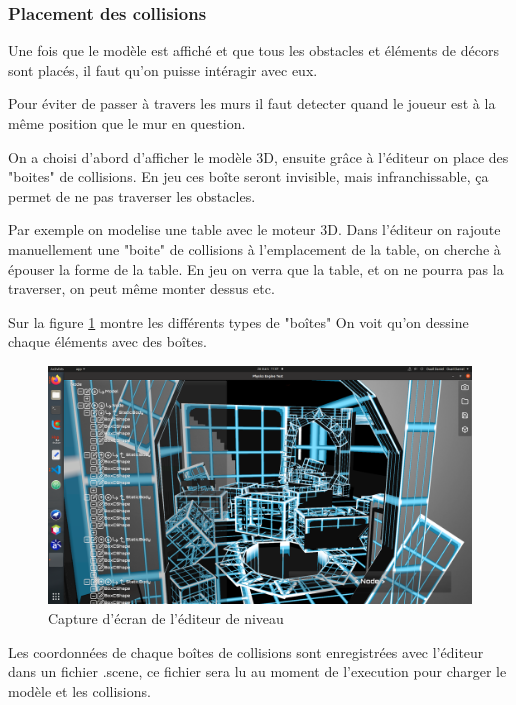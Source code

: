 \newpage
\subsubsection{Placement des collisions}
Une fois que le modèle est affiché et que tous les obstacles et éléments de
décors sont placés, il faut qu'on puisse intéragir avec eux.

Pour éviter de passer à travers les murs il faut detecter quand le joueur
est à la même position que le mur en question.

On a choisi d'abord d'afficher le modèle 3D, ensuite grâce à l'éditeur on
place des "boites" de collisions. En jeu ces boîte seront invisible, mais
infranchissable, ça permet de ne pas traverser les obstacles.

Par exemple on modelise une table avec le moteur 3D. Dans l'éditeur on rajoute
manuellement une "boite" de collisions à l'emplacement de la table, on cherche
à épouser la forme de la table. En jeu on verra que la table, et on ne pourra
pas la traverser, on peut même monter dessus etc.



Sur la figure \ref{fig:fig2} montre les différents types de "boîtes" On voit qu'on dessine
chaque éléments avec des boîtes.



\begin{figure}[H]
    \centering
    \includegraphics[width=1\linewidth]{images/screenshot_editeur.png}
    \caption{Capture d'écran de l'éditeur de niveau}
    \label{fig:fig2}
\end{figure}

Les coordonnées de chaque boîtes de collisions sont enregistrées avec l'éditeur
dans un fichier .scene, ce fichier sera lu au moment de l'execution pour
charger le modèle et les collisions.



\newpage